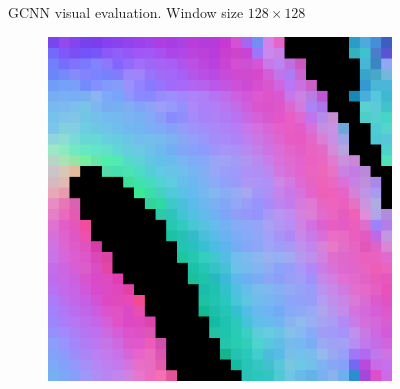 \begin{figure}[H]
	\decoRule
	\caption{GCNN visual evaluation. Window size $ 128\times128 $}
	\label{fig:gcnn-eval}
\end{figure}

\begin{figure}[th]
	\centering
	\begin{subfigure}[b]{0.18\linewidth}
		\includegraphics[width=\linewidth]{./Figures/gcnn_synthetic/eval_7_22_-8_normal.png}
	\end{subfigure}
	\begin{subfigure}[b]{0.18\linewidth}

\end{subfigure}
\end{figure}
